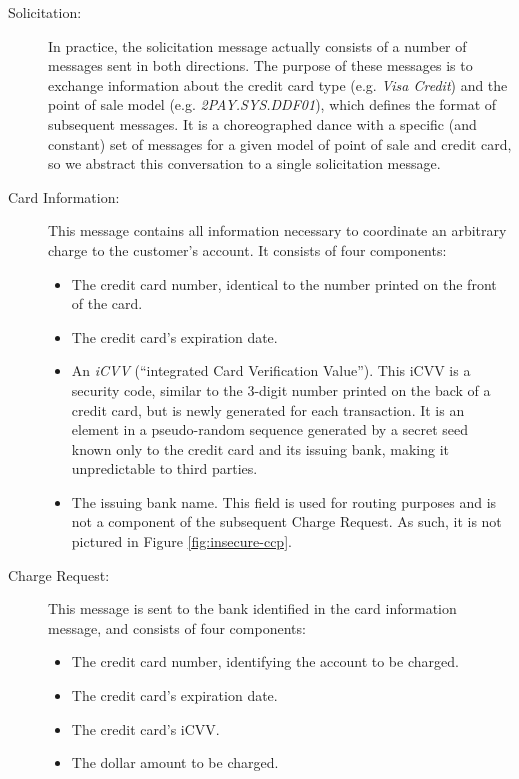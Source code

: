 \begin{description}

\item[Solicitation:]
In practice, the solicitation message actually consists of a number of messages sent in both directions.
The purpose of these messages is to exchange information about the credit card type (e.g. \emph{Visa Credit}) and the point of sale model (e.g. \emph{2PAY.SYS.DDF01}), which defines the format of subsequent messages.
It is a choreographed dance with a specific (and constant) set of messages for a given model of point of sale and credit card, so we abstract this conversation to a single solicitation message.

\item[Card Information:]
This message contains all information necessary to coordinate an arbitrary charge to the customer's account. It consists of four components:
\begin{itemize}
	\item The credit card number, identical to the number printed on the front of the card.
	\item The credit card's expiration date.
	\item An \emph{iCVV} (``integrated Card Verification Value'').
		This iCVV is a security code, similar to the 3-digit number printed on the back of a credit card, but is newly generated for each transaction.
		It is an element in a pseudo-random sequence generated by a secret seed known only to the credit card and its issuing bank, making it unpredictable to third parties.
	\item The issuing bank name.
		This field is used for routing purposes and is not a component of the subsequent Charge Request.
		As such, it is not pictured in Figure \ref{fig:insecure-ccp}.
\end{itemize}

\item[Charge Request:]
This message is sent to the bank identified in the card information message, and consists of four components:
\begin{itemize}
	\item The credit card number, identifying the account to be charged.
	\item The credit card's expiration date.
	\item The credit card's iCVV.
	\item The dollar amount to be charged.
\end{itemize}


\end{description}
